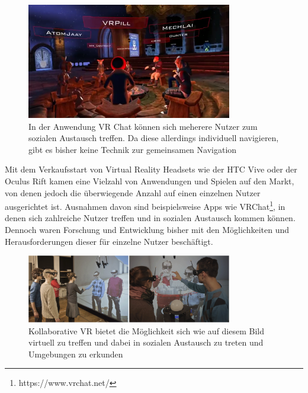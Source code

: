 \begin{figure}[h]
  \centering
  \includegraphics[width=0.8\textwidth]{images/vr_chat.png}
  \caption{In der Anwendung VR Chat können sich meherere Nutzer zum sozialen Austausch treffen. Da diese allerdings individuell navigieren, gibt es bisher keine Technik zur gemeinsamen Navigation}
  \label{fig:todo}
\end{figure}


Mit dem Verkaufsstart von Virtual Reality Headsets wie der HTC Vive oder der Oculus Rift kamen eine Vielzahl von Anwendungen und Spielen auf den Markt, von denen jedoch die überwiegende Anzahl auf einen einzelnen Nutzer ausgerichtet ist. Ausnahmen davon sind beispielsweise Apps wie VRChat\footnote{https://www.vrchat.net/}, in denen sich zahlreiche Nutzer treffen und in sozialen Austausch kommen können. Dennoch waren Forschung und Entwicklung bisher mit den Möglichkeiten und Herausforderungen dieser für einzelne Nutzer beschäftigt.

\begin{figure}[H]
	\centering
		\includegraphics[width=0.8\textwidth]{images/collaborative.jpg}
	\caption{Kollaborative VR bietet die Möglichkeit sich wie auf diesem Bild virtuell zu treffen und dabei in sozialen Austausch zu treten und Umgebungen zu erkunden \cite{BeckImmersiveTelepresence}}
\end{figure}


